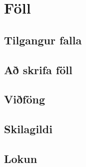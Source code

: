 
\chapter{Föll}\label{k:föll}

\section{Tilgangur falla}

\section{Að skrifa föll}

\section{Viðföng}

\section{Skilagildi}

\section{Lokun}